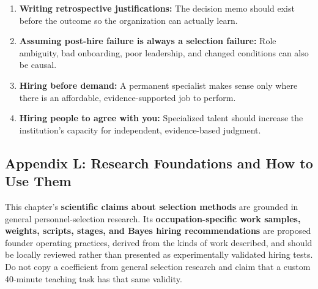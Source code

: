 \begin{enumerate}
    \item \textbf{Writing retrospective justifications:} The decision memo should exist before the outcome so the organization can actually learn.
    \item \textbf{Assuming post-hire failure is always a selection failure:} Role ambiguity, bad onboarding, poor leadership, and changed conditions can also be causal.
    \item \textbf{Hiring before demand:} A permanent specialist makes sense only where there is an affordable, evidence-supported job to perform.
    \item \textbf{Hiring people to agree with you:} Specialized talent should increase the institution's capacity for independent, evidence-based judgment.
\end{enumerate}

\subsection*{Appendix L: Research Foundations and How to Use Them}

This chapter's \textbf{scientific claims about selection methods} are grounded in general personnel-selection research. Its \textbf{occupation-specific work samples, weights, scripts, stages, and Bayes hiring recommendations} are proposed founder operating practices, derived from the kinds of work described, and should be locally reviewed rather than presented as experimentally validated hiring tests. Do not copy a coefficient from general selection research and claim that a custom 40-minute teaching task has that same validity.


